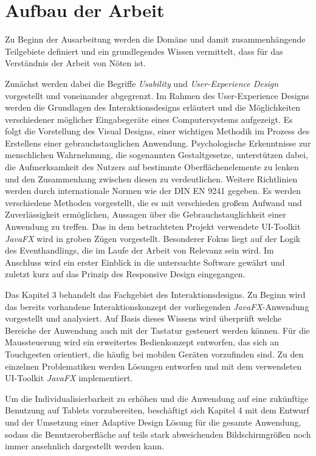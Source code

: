 \section{Aufbau der Arbeit} \label{sec:einlAufbau}
Zu Beginn der Ausarbeitung werden die Domäne und damit zusammenhängende Teilgebiete definiert und ein grundlegendes Wissen vermittelt, dass für das Verständnis der Arbeit von Nöten ist.\par
Zunächst werden dabei die Begriffe \textit{Usability} und \textit{User-Experience Design} vorgestellt und voneinander abgegrenzt. Im Rahmen des User-Experience Designs werden die Grundlagen des Interaktionsdesigns erläutert und die Möglichkeiten verschiedener möglicher Eingabegeräte eines Computersystems aufgezeigt. Es folgt die Vorstellung des Visual Designs, einer wichtigen Methodik im Prozess des Erstellens einer gebrauchstauglichen Anwendung. Psychologische Erkenntnisse zur menschlichen Wahrnehmung, die sogenannten Gestaltgesetze, unterstützen dabei, die Aufmerksamkeit des Nutzers auf bestimmte Oberflächenelemente zu lenken und den Zusammenhang zwischen diesen zu verdeutlichen. Weitere Richtlinien werden durch internationale Normen wie der DIN EN 9241 gegeben. Es werden verschiedene Methoden vorgestellt, die es mit verschieden großem Aufwand und Zuverlässigkeit ermöglichen, Aussagen über die Gebrauchstauglichkeit einer Anwendung zu treffen. Das in dem betrachteten Projekt verwendete UI-Toolkit \textit{JavaFX} wird in groben Zügen vorgestellt. Besonderer Fokus liegt auf der Logik des Eventhandlings, die im Laufe der Arbeit von Relevanz sein wird. Im Anschluss wird ein erster Einblick in die untersuchte Software gewährt und zuletzt kurz auf das Prinzip des Responsive Design eingegangen.\par
Das Kapitel 3 behandelt das Fachgebiet des Interaktionsdesigns. Zu Beginn wird das bereits vorhandene Interaktionskonzept der vorliegenden \textit{JavaFX}-Anwendung vorgestellt und analysiert. Auf Basis dieses Wissens wird überprüft welche Bereiche der Anwendung auch mit der Tastatur gesteuert werden können. Für die Maussteuerung wird ein erweitertes Bedienkonzept entworfen, das sich an Touchgesten orientiert, die häufig bei mobilen Geräten vorzufinden sind. Zu den einzelnen Problematiken werden Lösungen entworfen und mit dem verwendeten UI-Toolkit \textit{JavaFX} implementiert.\par
Um die Individualisierbarkeit zu erhöhen und die Anwendung auf eine zukünftige Benutzung auf Tablets vorzubereiten, beschäftigt sich Kapitel 4 mit dem Entwurf und der Umsetzung einer Adaptive Design Lösung für die gesamte Anwendung, sodass die Benutzeroberfläche auf teils stark abweichenden Bildschirmgrößen noch immer ansehnlich dargestellt werden kann.\par
